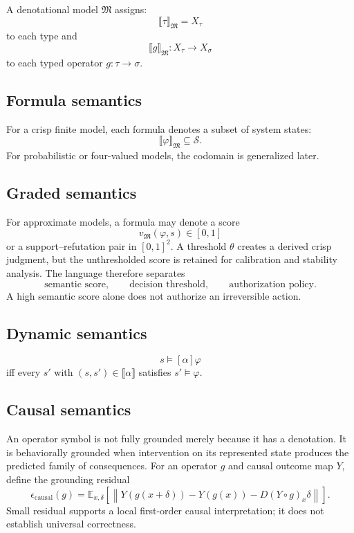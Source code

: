 \documentclass[11pt]{article}
\theoremstyle{definition}
\theoremstyle{remark}
\newcommand{\Sem}[1]{\llbracket #1\rrbracket}
\begin{document}
A denotational model \(\mathfrak M\) assigns:
\[
\Sem{\tau}_{\mathfrak M}=X_\tau
\]
to each type and
\[
\Sem{g}_{\mathfrak M}:X_\tau\to X_\sigma
\]
to each typed operator \(g:\tau\to\sigma\).

\subsection{Formula semantics}

For a crisp finite model, each formula denotes a subset of system states:
\[
\Sem{\varphi}_{\mathfrak M}\subseteq\mathcal S.
\]
For probabilistic or four-valued models, the codomain is generalized later.

\subsection{Graded semantics}

For approximate models, a formula may denote a score
\[
v_{\mathfrak M}(\varphi,s)\in[0,1]
\]
or a support--refutation pair in \([0,1]^2\). A threshold \(\theta\) creates a derived crisp judgment, but the unthresholded score is retained for calibration and stability analysis. The language therefore separates
\[
\text{semantic score},\qquad
\text{decision threshold},\qquad
\text{authorization policy}.
\]
A high semantic score alone does not authorize an irreversible action.

\subsection{Dynamic semantics}

\[
s\models[\alpha]\varphi
\]
iff every \(s'\) with \((s,s')\in\Sem{\alpha}\) satisfies \(s'\models\varphi\).

\subsection{Causal semantics}

An operator symbol is not fully grounded merely because it has a denotation. It is behaviorally grounded when intervention on its represented state produces the predicted family of consequences. For an operator \(g\) and causal outcome map \(Y\), define the grounding residual
\[
\epsilon_{\mathrm{causal}}(g)
=
\mathbb E_{x,\delta}
\left[
\left\|
Y(g(x+\delta))-Y(g(x))-D(Y\circ g)_x\delta
\right\|
\right].
\]
Small residual supports a local first-order causal interpretation; it does not establish universal correctness.
\end{document}
